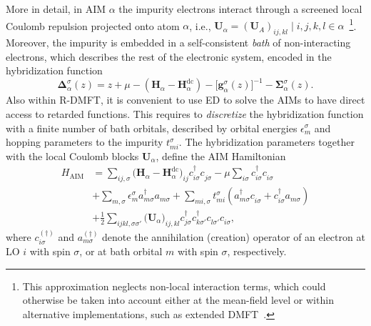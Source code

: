 \documentclass[aps,prx,twocolumn,superscriptaddress]{revtex4-2}
\begin{document}
More in detail, in AIM $\alpha$ the impurity electrons interact through a screened local Coulomb repulsion projected onto atom $\alpha$, i.e., $\mathbf{U}_{\alpha} = (\mathbf{U}_A)_{ij,kl} \mid i,j,k,l \in \alpha$~\footnote{This approximation neglects non-local interaction terms, which could otherwise be taken into account either at the mean-field level or within alternative implementations, 
such as extended DMFT~\cite{?}.}.
Moreover, the impurity is embedded in a self-consistent \emph{bath} of non-interacting electrons, which describes the rest of the electronic system, encoded in the hybridization function 
\begin{equation} \label{eq:DeltaDMFT_A}
    \mathbf{\Delta}^{\sigma}_{\alpha}(z) = z + \mu - (\mathbf{H}_{\alpha} - \mathbf{H}^{\mathrm{dc}}_{\alpha}) - \big[\mathbf{g}^{\sigma}_{\alpha}(z)\big]^{-1} 
                                         - \mathbf{\Sigma}^{\sigma}_{\alpha}(z). 
\end{equation}
Also within R-DMFT, it is convenient to use ED to solve the AIMs to have direct access to retarded functions.
This requires to \emph{discretize} the hybridization function with a finite number of bath orbitals, described by orbital energies $\epsilon^{\sigma}_{m}$ and hopping parameters to the impurity $t^{\sigma}_{mi}$. 
The hybridization parameters together with the local Coulomb blocks $\mathbf{U}_\alpha$, define the AIM Hamiltonian 
\begin{equation}
\begin{split}
    H_{\mathrm{AIM}} & = \sum_{ij,\sigma} \big( \mathbf{H}_\alpha-\mathbf{H}^{\mathrm{dc} }_\alpha \big)_{ij} c^{\dagger}_{i\sigma} c^{\phantom{\dagger}}_{j\sigma} - \mu \sum_{i\sigma} c^{\dagger}_{i\sigma} c^{\phantom{\dagger}}_{i\sigma} \\
                     & + \sum_{m,\sigma} \epsilon^{\sigma}_{m} a^{\dagger}_{m\sigma} a^{\phantom{\dagger}}_{m\sigma} 
                       + \sum_{mi,\sigma} t^{\sigma}_{mi} (a^{\dagger}_{m\sigma} c^{\phantom{\dagger}}_{i\sigma} + c^{\dagger}_{i\sigma} a^{\phantom{\dagger}}_{m\sigma}) \\
                     & + \frac{1}{2} \sum_{ijkl,\sigma\sigma'} \big( \mathbf{U}_\alpha \big)_{ij,kl} 
                         c^{\dagger}_{j\sigma} c^{\dagger}_{k\sigma'} c^{\phantom{\dagger}}_{l\sigma'} c^{\phantom{\dagger}}_{i\sigma},
\end{split}
\end{equation}
where $c^{(\dagger)}_{i\sigma}$ and $a^{(\dagger)}_{m\sigma}$ denote the annihilation (creation) operator of an electron at LO $i$ with spin $\sigma$, or at bath orbital $m$ with spin $\sigma$, respectively. 
\end{document}

